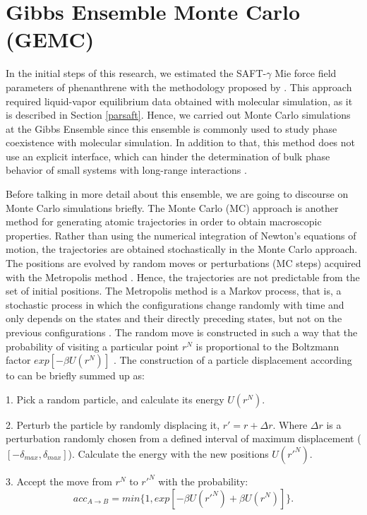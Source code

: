 \documentclass[
	12pt,				%
	openany,			%
	oneside,			%
	a4paper,			%
	english,			%
	brazil				%
	]{abntex2}
\begin{document}
\section{Gibbs Ensemble Monte Carlo (GEMC)}\label{gemc}

In the initial steps of this research, we estimated the SAFT-$\gamma$ Mie force field parameters of phenanthrene with the methodology proposed by . This approach required liquid-vapor equilibrium data obtained with molecular simulation, as it is described in Section \ref{parsaft}. Hence, we carried out Monte Carlo simulations at the Gibbs Ensemble \cite{papa1987} since this ensemble is commonly used to study phase coexistence with molecular simulation. In addition to that, this method does not use an explicit interface, which can hinder the determination of bulk phase behavior of small systems with long-range interactions \cite{C1FD00090J}. 

Before talking in more detail about this ensemble, we are going to discourse on Monte Carlo simulations briefly. The Monte Carlo (MC) approach is another method for generating atomic trajectories in order to obtain macroscopic properties. Rather than using the numerical integration of Newton's equations of motion, the trajectories are obtained stochastically in the Monte Carlo approach. The positions are evolved by random moves or perturbations (MC steps) acquired with the Metropolis method \cite{1953JChPh..21.1087M}. Hence, the trajectories are not predictable from the set of initial positions. The Metropolis method is a Markov process, that is, a stochastic process in which the configurations change randomly with time and only depends on the states and their directly preceding states, but not on the previous configurations \cite{raabe}. The random move is constructed in such a way that the probability of visiting a particular point $r^{N}$ is proportional to the Boltzmann factor $exp[-\beta U(r^{N})]$ \cite{frenkel}. The construction of a  particle displacement according to  can be briefly summed up as:

1. Pick a random particle, and calculate its energy $U(r^{N})$.

2. Perturb the particle by randomly displacing  it, $r' = r +\Delta r$. Where $\Delta r$ is a perturbation randomly chosen from a defined interval of maximum displacement ($[- \delta _{max},\delta _{max}]$). Calculate the energy with the new positions $U(r'^{N})$.

3. Accept the move from $r^{N}$ to $r'^{N}$ with the probability:
\begin{equation}
acc_{A \rightarrow B} = min \lbrace 1,exp[-\beta U(r'^{N}) + \beta U(r^{N}) ] \rbrace .
\end{equation}
\end{document}
